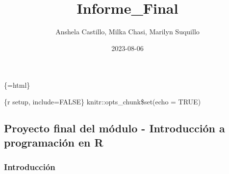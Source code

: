 \documentclass[
]{article}
\title{Informe\_Final}
\author{Anshela Castillo, Milka Chasi, Marilyn Suquillo}
\date{2023-08-06}
\begin{document}
\maketitle

\{=html\}

\{r setup, include=FALSE\} knitr::opts\_chunk\$set(echo = TRUE)

\hypertarget{proyecto-final-del-muxf3dulo---introducciuxf3n-a-programaciuxf3n-en-r}{%
\subsection{Proyecto final del módulo - Introducción a programación en
R}\label{proyecto-final-del-muxf3dulo---introducciuxf3n-a-programaciuxf3n-en-r}}

\hypertarget{introducciuxf3n}{%
\subsubsection{Introducción}\label{introducciuxf3n}}
\end{document}
